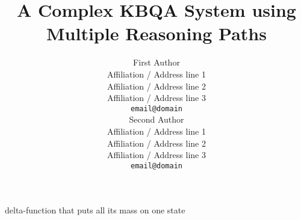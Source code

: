 \documentclass[11pt,a4paper]{article}
\title{A Complex KBQA System using Multiple Reasoning Paths}
\author{First Author \\
  Affiliation / Address line 1 \\
  Affiliation / Address line 2 \\
  Affiliation / Address line 3 \\
  \texttt{email@domain} \\\And
  Second Author \\
  Affiliation / Address line 1 \\
  Affiliation / Address line 2 \\
  Affiliation / Address line 3 \\
  \texttt{email@domain} \\}
\date{}
\begin{document}
\maketitle

\begin{abstract}

\end{abstract}

delta-function that puts all its mass on one state










\clearpage
\newpage



\end{document}
